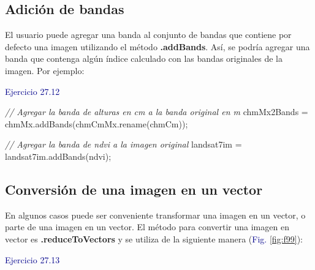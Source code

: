 \documentclass[
  12pt,
  letterpaper,
  twoside]{book}
\newenvironment{Shaded}{\begin{snugshade}}{\end{snugshade}}
\newcommand{\CommentTok}[1]{\textcolor[rgb]{0.24,0.58,0.00}{\textit{#1}}}
\newcommand{\FunctionTok}[1]{\textcolor[rgb]{0.48,0.12,0.64}{#1}}
\newcommand{\NormalTok}[1]{#1}
\newcommand{\OperatorTok}[1]{\textcolor[rgb]{0.00,0.00,0.00}{#1}}
\newcommand{\StringTok}[1]{\textcolor[rgb]{0.87,0.29,0.22}{#1}}
\newcommand\boldpurple[1]{\textcolor{darkpurple}{\textbf{#1}}}
\begin{document}
\hypertarget{adiciuxf3n-de-bandas}{%
\subsection*{Adición de bandas}\label{adiciuxf3n-de-bandas}}

El usuario puede agregar una banda al conjunto de bandas que contiene por defecto una imagen utilizando el método \boldpurple{.addBands}. Así, se podría agregar una banda que contenga algún índice calculado con las bandas originales de la imagen. Por ejemplo:

\textcolor{darkblue}{Ejercicio 27.12}

\begin{Shaded}
\begin{Highlighting}[]
\CommentTok{// Agregar la banda de alturas en cm a la banda original en m}
\NormalTok{chmMx2Bands }\OperatorTok{=}\NormalTok{ chmMx}\OperatorTok{.}\FunctionTok{addBands}\NormalTok{(chmCmMx}\OperatorTok{.}\FunctionTok{rename}\NormalTok{(}\StringTok{\textquotesingle{}chmCm\textquotesingle{}}\NormalTok{))}\OperatorTok{;}

\CommentTok{// Agregar la banda de ndvi a la imagen original}
\NormalTok{landsat7im }\OperatorTok{=}\NormalTok{ landsat7im}\OperatorTok{.}\FunctionTok{addBands}\NormalTok{(ndvi)}\OperatorTok{;}
\end{Highlighting}
\end{Shaded}

\hypertarget{conversiuxf3n-de-una-imagen-en-un-vector}{%
\subsection*{Conversión de una imagen en un vector}\label{conversiuxf3n-de-una-imagen-en-un-vector}}

En algunos casos puede ser conveniente transformar una imagen en un vector, o parte de una imagen en un vector. El método para convertir una imagen en vector es \boldpurple{.reduceToVectors} y se utiliza de la siguiente manera (\textcolor{darkblue}{Fig.} \ref{fig:f99}):

\textcolor{darkblue}{Ejercicio 27.13}
\end{document}
